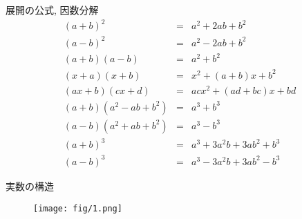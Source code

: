 \documentclass[aspectratio=169, 12pt]{beamer} %
\begin{document}
\begin{frame}{展開の公式, 因数分解}
    \begin{eqnarray*}
        (a+b)^2&=&a^2+2ab+b^2 \\
        (a-b)^2&=&a^2-2ab+b^2 \\
        (a+b)(a-b)&=&a^2+b^2 \\
        (x+a)(x+b)&=&x^2+(a+b)x+b^2 \\
        (ax+b)(cx+d)&=&acx^2+(ad+bc)x+bd \\
        (a+b)(a^2-ab+b^2)&=&a^3+b^3 \\
        (a-b)(a^2+ab+b^2)&=&a^3-b^3 \\
        (a+b)^3&=&a^3+3a^2b+3ab^2+b^3 \\
        (a-b)^3&=&a^3-3a^2b+3ab^2-b^3
    \end{eqnarray*}
\end{frame}
\begin{frame}{実数の構造}
    \begin{figure}[htbp]
        \begin{center}
            \texttt{[image: fig/1.png]}
        \end{center}
    \end{figure}
\end{frame}
\end{document}
